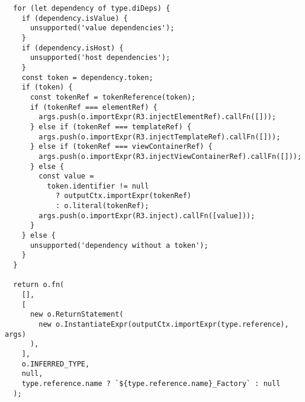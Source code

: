 \begin{verbatim}
  for (let dependency of type.diDeps) {
    if (dependency.isValue) {
      unsupported('value dependencies');
    }
    if (dependency.isHost) {
      unsupported('host dependencies');
    }
    const token = dependency.token;
    if (token) {
      const tokenRef = tokenReference(token);
      if (tokenRef === elementRef) {
        args.push(o.importExpr(R3.injectElementRef).callFn([]));
      } else if (tokenRef === templateRef) {
        args.push(o.importExpr(R3.injectTemplateRef).callFn([]));
      } else if (tokenRef === viewContainerRef) {
        args.push(o.importExpr(R3.injectViewContainerRef).callFn([]));
      } else {
        const value =
          token.identifier != null
            ? outputCtx.importExpr(tokenRef)
            : o.literal(tokenRef);
        args.push(o.importExpr(R3.inject).callFn([value]));
      }
    } else {
      unsupported('dependency without a token');
    }
  }

  return o.fn(
    [],
    [
      new o.ReturnStatement(
        new o.InstantiateExpr(outputCtx.importExpr(type.reference), args)
      ),
    ],
    o.INFERRED_TYPE,
    null,
    type.reference.name ? `${type.reference.name}_Factory` : null
  );
\end{verbatim}
